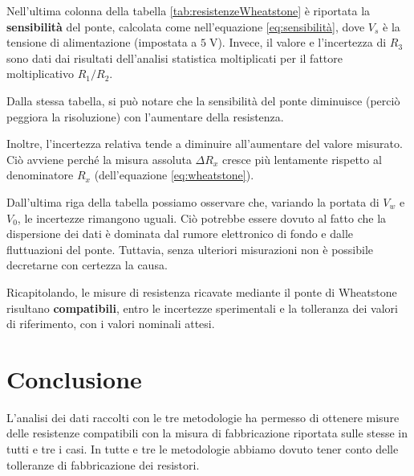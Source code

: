 \documentclass[11pt]{article}
\begin{document}
Nell'ultima colonna della tabella \ref{tab:resistenzeWheatstone} è riportata la \textbf{sensibilità} del ponte, calcolata come nell'equazione \ref{eq:sensibilità}, dove $V_s$ è la tensione di alimentazione (impostata a $5 \;\text{V}$).
Invece, il valore e l'incertezza di $R_3$ sono dati dai risultati dell'analisi statistica moltiplicati per il fattore moltiplicativo $R_1/R_2$.

Dalla stessa tabella, si può notare che la sensibilità del ponte diminuisce (perciò peggiora la risoluzione) con l'aumentare della resistenza. 

Inoltre, l'incertezza relativa tende a diminuire all’aumentare del valore misurato. Ciò avviene perché la misura assoluta $\Delta R_x$ cresce più lentamente rispetto al denominatore $R_x$ (dell'equazione \ref{eq:wheatstone}).

Dall'ultima riga della tabella possiamo osservare che, variando la portata di $V_w$ e $V_0$, le incertezze rimangono uguali. Ciò potrebbe essere dovuto al fatto che la dispersione dei dati è dominata dal rumore elettronico di fondo e dalle fluttuazioni del ponte. Tuttavia, senza ulteriori misurazioni non è possibile decretarne con certezza la causa.

Ricapitolando, le misure di resistenza ricavate mediante il ponte di Wheatstone risultano \textbf{compatibili}, entro le incertezze sperimentali e la tolleranza dei valori di riferimento, con i valori nominali attesi.

\section{Conclusione}
L’analisi dei dati raccolti con le tre metodologie ha permesso di ottenere misure 
delle resistenze compatibili con la misura di fabbricazione riportata sulle stesse 
in tutti e tre i casi. In tutte e tre le metodologie abbiamo dovuto tener conto delle tolleranze di fabbricazione
dei resistori.


\vspace{1cm}
\tableofcontents
\newpage
\end{document}

